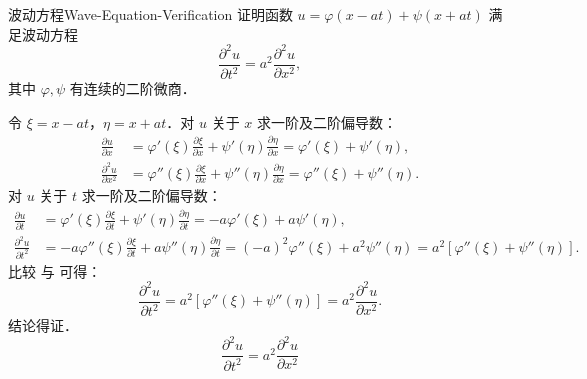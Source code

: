 \begin{problem}{波动方程}{Wave-Equation-Verification}
    证明函数 $u = \varphi(x - at) + \psi(x + at)$ 满足波动方程
    \begin{equation}
        \frac{\partial^2 u}{\partial t^2} = a^2 \frac{\partial^2 u}{\partial x^2},
    \end{equation}
    其中 $\varphi, \psi$ 有连续的二阶微商．
\end{problem}

\begin{myproof}
    令 $\xi = x - at$，$\eta = x + at$．对 $u$ 关于 $x$ 求一阶及二阶偏导数：
    \begin{equation} \label{eq:u-xx}
        \begin{aligned}
            \frac{\partial u}{\partial x}     & = \varphi'(\xi) \frac{\partial \xi}{\partial x} + \psi'(\eta) \frac{\partial \eta}{\partial x} = \varphi'(\xi) + \psi'(\eta),     \\
            \frac{\partial^2 u}{\partial x^2} & = \varphi''(\xi) \frac{\partial \xi}{\partial x} + \psi''(\eta) \frac{\partial \eta}{\partial x} = \varphi''(\xi) + \psi''(\eta).
        \end{aligned}
    \end{equation}
    对 $u$ 关于 $t$ 求一阶及二阶偏导数：
    \begin{equation} \label{eq:u-tt}
        \begin{aligned}
            \frac{\partial u}{\partial t}     & = \varphi'(\xi) \frac{\partial \xi}{\partial t} + \psi'(\eta) \frac{\partial \eta}{\partial t} = -a \varphi'(\xi) + a \psi'(\eta),                                                                   \\
            \frac{\partial^2 u}{\partial t^2} & = -a \varphi''(\xi) \frac{\partial \xi}{\partial t} + a \psi''(\eta) \frac{\partial \eta}{\partial t} = (-a)^2 \varphi''(\xi) + a^2 \psi''(\eta) = a^2 \left[ \varphi''(\xi) + \psi''(\eta) \right].
        \end{aligned}
    \end{equation}
    比较  与  可得：
    \begin{equation}
        \frac{\partial^2 u}{\partial t^2} = a^2 \left[ \varphi''(\xi) + \psi''(\eta) \right] = a^2 \frac{\partial^2 u}{\partial x^2}.
    \end{equation}
    结论得证．
    \begin{equation}
        \boxed{\frac{\partial^2 u}{\partial t^2} = a^2 \frac{\partial^2 u}{\partial x^2}}
    \end{equation}
\end{myproof}



